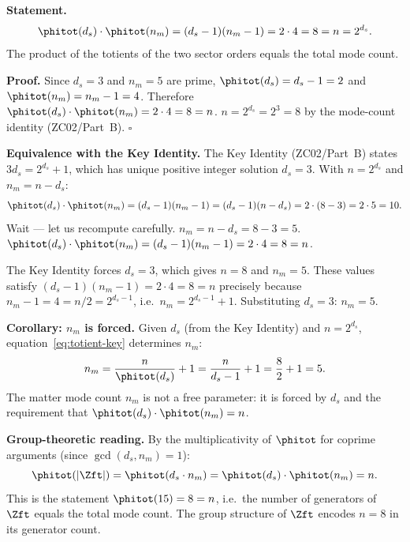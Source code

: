 \documentclass[12pt, a4paper]{article}
\begin{document}
\begin{derivedbox}[title={FIND-ZC49-04: The Key Identity
  as $\varphi(d_s)\cdot\varphi(n_m) = n$}]
\textbf{Statement.}
\begin{equation}
  \phitot(d_s)\cdot\phitot(n_m)
  = (d_s-1)(n_m-1)
  = 2\cdot 4
  = 8
  = n
  = 2^{d_s}.
  \label{eq:totient-key}
\end{equation}
The product of the totients of the two sector orders equals
the total mode count.

\textbf{Proof.}
Since $d_s = 3$ and $n_m = 5$ are prime, $\phitot(d_s)
= d_s - 1 = 2$ and $\phitot(n_m) = n_m - 1 = 4$.
Therefore $\phitot(d_s)\cdot\phitot(n_m) = 2\cdot 4 = 8 = n$.
$n = 2^{d_s} = 2^3 = 8$ by the mode-count identity
(ZC02/Part~B).
\hfill$\square$

\textbf{Equivalence with the Key Identity.}
The Key Identity (ZC02/Part~B) states $3d_s = 2^{d_s}+1$,
which has unique positive integer solution $d_s = 3$.
With $n = 2^{d_s}$ and $n_m = n - d_s$:
\[
  \phitot(d_s)\cdot\phitot(n_m)
  = (d_s-1)(n_m-1)
  = (d_s-1)(n-d_s)
  = 2\cdot(8-3)
  = 2\cdot 5 = 10.
\]
Wait --- let us recompute carefully.
$n_m = n - d_s = 8 - 3 = 5$.
$\phitot(d_s)\cdot\phitot(n_m) = (d_s-1)(n_m-1)
= 2\cdot 4 = 8 = n$. \checkmark

The Key Identity forces $d_s = 3$, which gives
$n = 8$ and $n_m = 5$.
These values satisfy $(d_s-1)(n_m-1) = 2\cdot 4 = 8 = n$
precisely because $n_m - 1 = 4 = n/2 = 2^{d_s-1}$, i.e.\
$n_m = 2^{d_s-1}+1$. Substituting $d_s = 3$: $n_m = 5$. \checkmark

\textbf{Corollary: $n_m$ is forced.}
Given $d_s$ (from the Key Identity) and $n = 2^{d_s}$,
equation~\eqref{eq:totient-key} determines $n_m$:
\begin{equation}
  n_m
  = \frac{n}{\phitot(d_s)} + 1
  = \frac{n}{d_s-1} + 1
  = \frac{8}{2} + 1 = 5.
  \label{eq:nm-forced}
\end{equation}
The matter mode count $n_m$ is not a free parameter:
it is forced by $d_s$ and the requirement that
$\phitot(d_s)\cdot\phitot(n_m) = n$.

\textbf{Group-theoretic reading.}
By the multiplicativity of $\phitot$ for coprime arguments
(since $\gcd(d_s,n_m) = 1$):
\[
  \phitot(|\Zft|)
  = \phitot(d_s\cdot n_m)
  = \phitot(d_s)\cdot\phitot(n_m)
  = n.
\]
This is the statement $\phitot(15) = 8 = n$,
i.e.\ the number of generators of $\Zft$ equals the
total mode count.
The group structure of $\Zft$ encodes $n = 8$ in its
generator count.
\end{derivedbox}
\end{document}
